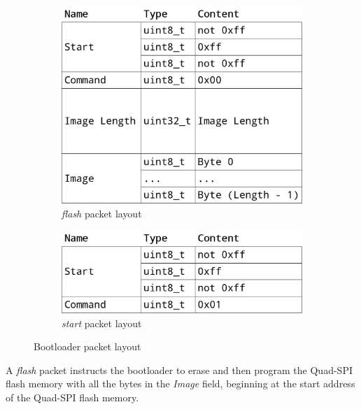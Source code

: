 \begin{figure}[h]
    \centering

    \begin{subfigure}[t]{0.5\textwidth}
        \centering
        \includegraphics[scale=0.18]{img/bootloader_flash_packet.png}
        \caption{\textit{flash} packet layout}
    \end{subfigure}%
    \begin{subfigure}[t]{0.5\textwidth}
        \centering
        \includegraphics[scale=0.18]{img/bootloader_start_packet.png}
        \caption{\textit{start} packet layout}
    \end{subfigure}

    \caption{Bootloader packet layout}
    \label{implementation/software/bootloader/packet-layout}
\end{figure}

A \textit{flash} packet instructs the bootloader to erase and then program the Quad-SPI flash memory
with all the bytes in the \textit{Image} field, beginning at the start address of the Quad-SPI flash
memory.

